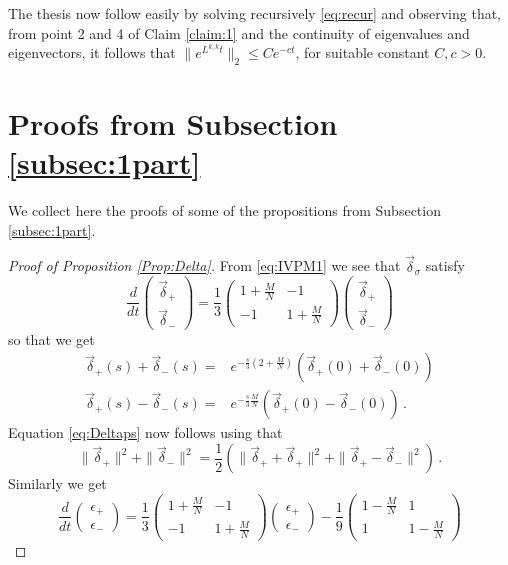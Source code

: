 \documentclass{article}
\begin{document}
The thesis now follow easily by solving recursively \eqref{eq:recur} and observing that, from point 2 and 4 of Claim 
\ref{claim:1} and the continuity of eigenvalues and eigenvectors, it follows that $\|e^{L^{k,k}t}\|_2\leq Ce^{-ct}$, 
for suitable constant $C,c>0$.

\section{Proofs from Subsection \ref{subsec:1part}}\label{app:proofs}

We collect here the proofs of some of the propositions from Subsection \ref{subsec:1part}.

\begin{proof}[Proof of Proposition \ref{Prop:Delta}]
From \eqref{eq:IVPM1} we see that $\vec \delta_\sigma$ satisfy 
\[
\frac{d}{dt}\begin{pmatrix}
\vec \delta_+\\\vec \delta_-
\end{pmatrix}=
\frac13\begin{pmatrix} 1+\frac MN & -1\\ -1 & 1+\frac MN
\end{pmatrix}
\begin{pmatrix}
\vec \delta_+\\\vec \delta_-
\end{pmatrix}
\]
so that we get
\[
\begin{aligned}
\vec \delta_+(s)+\vec \delta_-(s)=&e^{-\frac s3\left(2+\frac MN\right)}(\vec \delta_+(0)+\vec \delta_-(0))\\
\vec \delta_+(s)-\vec \delta_-(s)=&e^{-\frac s3\frac MN}(\vec \delta_+(0)-\vec \delta_-(0))\, .
\end{aligned}
\]
Equation \eqref{eq:Deltaps} now follows using that
\[
\|\vec \delta_+\|^2+\|\vec \delta_-\|^2=\frac 12\left (\|\vec \delta_++\vec \delta_+\|^2+\|\vec 
\delta_+-\vec \delta_-\|^2\right)\, .
\]
Similarly we get
\[
\frac{d}{dt}\begin{pmatrix}
\epsilon_+\\\epsilon_-
\end{pmatrix}=
\frac13\begin{pmatrix} 1+\frac MN & -1\\ -1 & 1+\frac MN
\end{pmatrix}
\begin{pmatrix}
\epsilon_+\\\epsilon_-
\end{pmatrix}
 - \frac 19\begin{pmatrix} 1-\frac MN & 1\\ 1 & 1-\frac MN

\end{pmatrix}\]
\end{proof}
\end{document}
